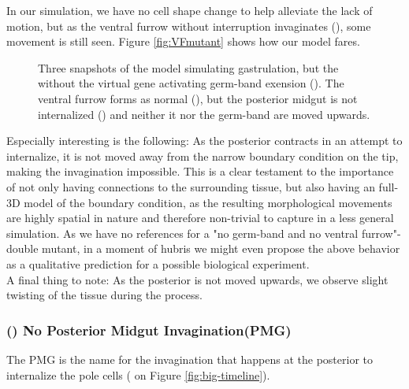 In our simulation, we have no cell shape change to help alleviate the lack of motion, but as the ventral furrow without interruption invaginates (), some movement is still seen. 
Figure \ref{fig:VFmutant} shows how our model fares.

\begin{figure}[H]
    \centering

    \caption{Three snapshots of the model simulating gastrulation, but the without the virtual gene activating germ-band exension (). The ventral furrow forms as normal (), but the posterior midgut is not internalized () and neither it nor the germ-band are moved upwards.}
    \label{fig:germ-band-mutant}
\end{figure}



Especially interesting is the following: As the posterior contracts in an attempt to internalize, it is not moved away from the narrow boundary condition on the tip, making the invagination impossible. This is a clear testament to the importance of not only having  connections to the surrounding tissue, but also having an full-3D model of the boundary condition, as the resulting morphological movements are highly spatial in nature and therefore non-trivial to capture in a less general simulation. As we have no references for a "no germ-band and no ventral furrow"-double mutant, in a moment of hubris we might even propose the above behavior as a qualitative prediction for a possible biological experiment.\\  
A final thing to note: As the posterior is not moved upwards, we observe slight twisting of the tissue during the process. 


\subsubsection{() No Posterior Midgut Invagination(PMG)}
The PMG is the name for the invagination that happens at the posterior to internalize the pole cells ( on Figure \ref{fig:big-timeline}).

